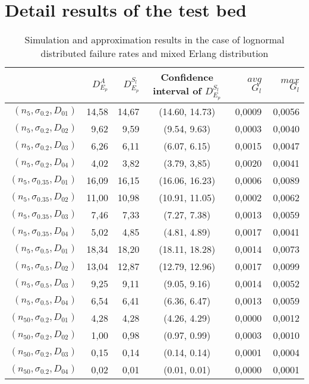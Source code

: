 \documentclass[preprint,12pt]{elsarticle}
\begin{document}
\section{Detail results of the test bed}
\label{detailapptable}
\begin{table}[htbp]
  \centering
  \caption{Simulation and approximation results in the case of lognormal distributed failure rates and mixed Erlang distribution}
    \begin{tabular}{rrrcrr}
    \toprule
          & $D_{E_{p}}^{A}$ & $D_{E_{p}}^{S_{l}}$ & Confidence interval of $D_{E_{p}}^{S_{l}}$ & $avg$ $G_{l}$ & $max$ $G_{l}$ \\
    \midrule
$(n_{5},\sigma_{0.2},D_{01})$& 14,58 & 14,67 & (14.60, 14.73) & 0,0009 & 0,0056 \\
$(n_{5},\sigma_{0.2},D_{02})$& 9,62  & 9,59  & (9.54, 9.63) & 0,0003 & 0,0040 \\
$(n_{5},\sigma_{0.2},D_{03})$ & 6,26  & 6,11  & (6.07, 6.15) & 0,0015 & 0,0047 \\
$(n_{5},\sigma_{0.2},D_{04})$& 4,02  & 3,82  & (3.79, 3,85) & 0,0020 & 0,0041 \\
$(n_{5},\sigma_{0.35},D_{01})$ & 16,09 & 16,15 & (16.06, 16.23) & 0,0006 & 0,0089 \\
$(n_{5},\sigma_{0.35},D_{02})$& 11,00 & 10,98 & (10.91, 11.05) & 0,0002 & 0,0062 \\
$(n_{5},\sigma_{0.35},D_{03})$ & 7,46  & 7,33  & (7.27, 7.38) & 0,0013 & 0,0059 \\
$(n_{5},\sigma_{0.35},D_{04})$ & 5,02  & 4,85  & (4.81, 4.89) & 0,0017 & 0,0041 \\
$(n_{5},\sigma_{0.5},D_{01})$ & 18,34 & 18,20 & (18.11, 18.28) & 0,0014 & 0,0073 \\
$(n_{5},\sigma_{0.5},D_{02})$ & 13,04 & 12,87 & (12.79, 12.96) & 0,0017 & 0,0099 \\
$(n_{5},\sigma_{0.5},D_{03})$ & 9,25  & 9,11  & (9.05, 9.16) & 0,0014 & 0,0052 \\
$(n_{5},\sigma_{0.5},D_{04})$ & 6,54  & 6,41  & (6.36, 6.47) & 0,0013 & 0,0059 \\
 $(n_{50},\sigma_{0.2},D_{01})$& 4,28  & 4,28  & (4.26, 4.29) & 0,0000 & 0,0012 \\
 $(n_{50},\sigma_{0.2},D_{02})$& 1,00  & 0,98  & (0.97, 0.99) & 0,0003 & 0,0010 \\
 $(n_{50},\sigma_{0.2},D_{03})$& 0,15  & 0,14  & (0.14, 0.14) & 0,0001 & 0,0004 \\
 $(n_{50},\sigma_{0.2},D_{04})$ & 0,02  & 0,01  &  (0.01, 0.01) & 0,0000 & 0,0001 \\

\end{tabular}
\end{table}
\end{document}
